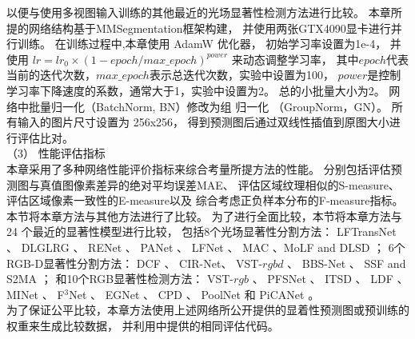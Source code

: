 以便与使用多视图输入训练的其他最近的光场显著性检测方法进行比较。
本章所提的网络结构基于MMSegmentation框架构建，
并使用两张GTX4090显卡进行并行训练。
在训练过程中,本章使用 AdamW 优化器，
初始学习率设置为1e-4，
并使用
$lr = lr_{0} \times (1- epoch/ max\_epoch)^{power}$
来动态调整学习率，
其中$epoch$代表当前的迭代次数，$max\_epoch$表示总迭代次数，实验中设置为100，
$power$是控制学习率下降速度的系数，通常大于1，实验中设置为2。
总的小批量大小为2。
网络中批量归一化（BatchNorm, BN）修改为组
归一化 （GroupNorm，GN）。
所有输入的图片尺寸设置为 256x256，
得到预测图后通过双线性插值到原图大小进行评估比对。\\
%
%
%
%
\indent 
（3）
性能评估指标\\
%
%
%
%
\indent
本章采用了多种网络性能评价指标来综合考量所提方法的性能。
分别包括评估预测图与真值图像素差异的绝对平均误差MAE、
评估区域纹理相似的S-measure、
评估区域像素一致性的E-measure以及
综合考虑正负样本分布的F-measure指标。
%
%
%
%
本节将本章方法与其他方法进行了比较。
为了进行全面比较，本节将本章方法与 24 个最近的显著性模型进行比较，
包括8个光场显著性分割方法：
LFTransNet 、
DLGLRG 、 RENet 、
PANet 、
LFNet 、
MAC 、MoLF  and DLSD ；
%
%
%
%
6个RGB-D显著性分割方法：
DCF 、
CIR-Net、 
VST-$rgbd$  、
BBS-Net     、 
SSF and S2MA    ；
%
%
%
%
%
和10个RGB显著性检测方法：
VST-$rgb$ 、
PFSNet 、
ITSD 、
LDF 、
MINet 、
F$^{3}$Net  、 
EGNet   、
CPD  、
PoolNet 和
PiCANet 。
%
\\
%
%
%
%
\indent
为了保证公平比较，本章方法使用上述网络所公开提供的显着性预测图或预训练的权重来生成比较数据，
并利用中提供的相同评估代码。 
\\
